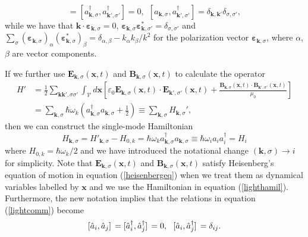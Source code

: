 \begin{equation}
[a_{\boldsymbol{k},\sigma}, a_{\boldsymbol{k}',\sigma'}] = [a_{\boldsymbol{k},\sigma}^\dagger, a_{\boldsymbol{k}',\sigma'}^\dagger] = 0, ~~ [a_{\boldsymbol{k},\sigma}, a_{\boldsymbol{k}',\sigma'}^\dagger] = \delta_{\boldsymbol{k},\boldsymbol{k}'}\delta_{\sigma, \sigma'},
\label{lightcomm}
\end{equation}
while we have that $\boldsymbol{k}\cdot \boldsymbol{\varepsilon}_{\boldsymbol{k},\sigma} = 0$, $\boldsymbol{\varepsilon}_{\boldsymbol{k},\sigma}\boldsymbol{\varepsilon}_{\boldsymbol{k},\sigma'}^{*} = \delta_{\sigma, \sigma'}$ and $\sum_\sigma (\boldsymbol{\varepsilon}_{\boldsymbol{k},\sigma})_\alpha (\boldsymbol{\varepsilon}_{\boldsymbol{k},\sigma}^{*})_\beta = \delta_{\alpha, \beta} - k_\alpha k_\beta /k^2$ for the polarization vector $\boldsymbol{\varepsilon}_{\boldsymbol{k},\sigma}$, where $\alpha$, $\beta$ are vector components.

If we further use $\boldsymbol{E}_{\boldsymbol{k}, \sigma}(\boldsymbol{x},t)$ and $\boldsymbol{B}_{\boldsymbol{k}, \sigma}(\boldsymbol{x},t)$ to calculate the operator
\begin{align}
H' &= \frac{1}{2} \sum_{\boldsymbol{k} \boldsymbol{k}', \sigma \sigma'} \int_{\mathcal{V}} d\boldsymbol{x} \left[\varepsilon_0 \boldsymbol{E}_{\boldsymbol{k}, \sigma}(\boldsymbol{x},t) \cdot \boldsymbol{E}_{\boldsymbol{k}', \sigma'}(\boldsymbol{x},t) + \frac{\boldsymbol{B}_{\boldsymbol{k}, \sigma}(\boldsymbol{x},t) \cdot \boldsymbol{B}_{\boldsymbol{k}', \sigma'}(\boldsymbol{x},t)}{\mu_0}  \right]
\nonumber \\
&= \sum_{\boldsymbol{k}, \sigma} \hbar \omega_k \left( a_{\boldsymbol{k}, \sigma}^\dagger a_{\boldsymbol{k}, \sigma} + \frac{1}{2} \right) \equiv \sum_{\boldsymbol{k}, \sigma} H_{\boldsymbol{k}, \sigma}',
\end{align}
then we can construct the single-mode Hamiltonian
\begin{equation}
H_{\boldsymbol{k}, \sigma} = H'_{\boldsymbol{k}, \sigma} - H_{0,k} = \hbar \omega_k a_{\boldsymbol{k}, \sigma}^\dagger a_{\boldsymbol{k}, \sigma} \equiv \hbar \omega_i a_i a_i^\dagger = H_i
\label{lighthamil}
\end{equation}
where $H_{0,k} = \hbar \omega_k/2$ and we have introduced the notational change $(\boldsymbol{k}, \sigma) \rightarrow i$ for simplicity. Note that $\boldsymbol{E}_{\boldsymbol{k},\sigma}(\boldsymbol{x},t)$ and $\boldsymbol{B}_{\boldsymbol{k},\sigma}(\boldsymbol{x},t)$ satisfy Heisenberg's equation of motion in equation (\ref{heisenbergeq}) when we treat them as dynamical variables labelled by $\boldsymbol{x}$ and we use the Hamiltonian in equation (\ref{lighthamil}). Furthermore, the new notation implies that the relations in equation (\ref{lightcomm}) become
\begin{equation}
\comm*{\hat{a}_i}{\hat{a}_j} = \comm*{\hat{a}_i^{\dagger}}{\hat{a}_j^{\dagger}} = 0, ~~\comm*{\hat{a}_i}{\hat{a}_j^{\dagger}} = \delta_{ij}.
\label{commlightsimple}
\end{equation}

